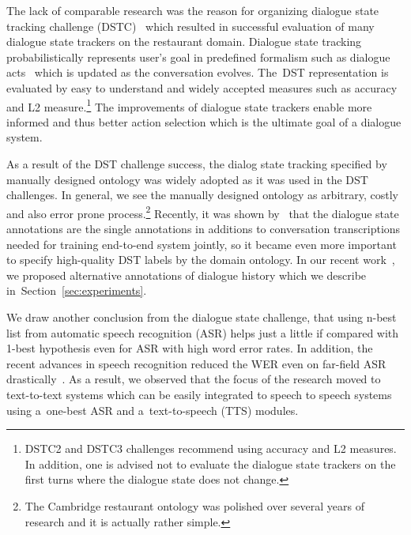 \documentclass[11pt]{article}
\begin{document}
The lack of comparable research was the reason for organizing dialogue state tracking challenge (DSTC)~\cite{dstcwilliams} which resulted in successful evaluation of many dialogue state trackers on the restaurant domain.
Dialogue state tracking probabilistically represents user's goal in predefined formalism such as dialogue acts~\cite{dstcwilliams,henderson2014second,hendersonthird} which is updated as the conversation evolves.
The~DST representation is evaluated by easy to understand and widely accepted measures such as accuracy and L2 measure.\footnote{DSTC2 and DSTC3 challenges recommend using accuracy and L2 measures. In addition, one is advised not to evaluate the dialogue state trackers on the first turns where the dialogue state does not change.}
The improvements of dialogue state trackers enable more informed and thus better action selection which is the ultimate goal of a dialogue system.

As a result of the DST challenge success, the dialog state tracking specified by manually designed ontology was widely adopted as it was used in the DST challenges.
In general, we see the manually designed ontology as arbitrary, costly and also error prone process.\footnote{The Cambridge restaurant ontology was polished over several years of research and it is actually rather simple.}
Recently, it was shown by~\cite{wen_networkbased_2016} that the dialogue state annotations are the single annotations in additions to conversation transcriptions needed for training end-to-end system jointly, so it became even more important to specify high-quality DST labels by the domain ontology.
In our recent work~\cite{platek2016wochat}, we proposed alternative annotations of dialogue history which we describe in~Section~\ref{sec:experiments}.

We draw another conclusion from the dialogue state challenge, that using n-best list from automatic speech recognition (ASR) helps just a little if compared with 1-best hypothesis even for ASR with high word error rates.
In addition, the recent advances in speech recognition reduced the WER even on far-field ASR drastically~\cite{peddinti_jhu_2015,zhang_highway_2016}.
As a result, we observed that the focus of the research moved to text-to-text systems which can be easily integrated to speech to speech systems using a~one-best ASR and a~text-to-speech (TTS) modules.
\end{document}
